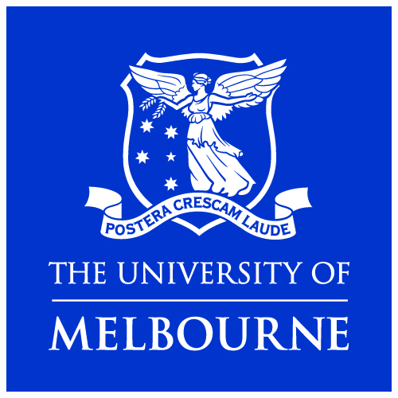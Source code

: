 \documentclass[25pt, a0paper, portrait, margin=0mm, innermargin=15mm,
     blockverticalspace=15mm, colspace=15mm, subcolspace=8mm]{tikzposter} %
\begin{document}
\begin{columns}
\begin{subcolumns}
{\begin{center}
       \includegraphics[scale=1.2]{pics/unimelb-logo.jpg}
      \end{center}
       }
        
 \end{subcolumns}
 \end{columns}         

 
\end{document}
